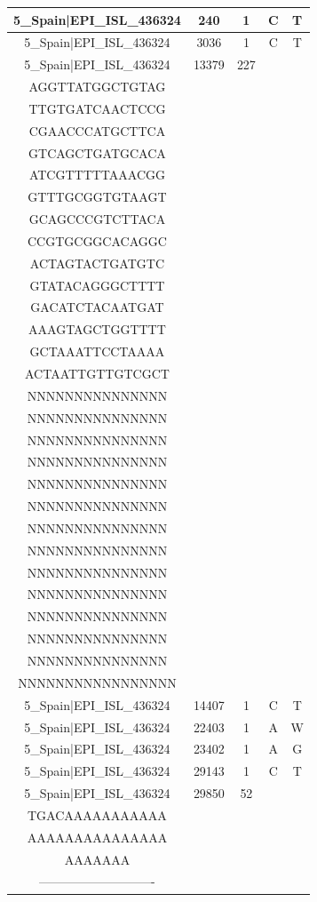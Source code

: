 \documentclass[a4paper,10pt]{article}
\begin{document}
\begin{longtable}{@{}ccccc@{}}
5\_Spain|EPI\_ISL\_436324 & 240 & 1 & C & T \\* \midrule
5\_Spain|EPI\_ISL\_436324 & 3036 & 1 & C & T \\* \midrule
5\_Spain|EPI\_ISL\_436324 & 13379 & 227 & \begin{tabular}[c]{@{}c@{}}TCTGCGGTATGTGGAA\\ AGGTTATGGCTGTAG\\ TTGTGATCAACTCCG\\ CGAACCCATGCTTCA\\ GTCAGCTGATGCACA\\ ATCGTTTTTAAACGG\\ GTTTGCGGTGTAAGT\\ GCAGCCCGTCTTACA\\ CCGTGCGGCACAGGC\\ ACTAGTACTGATGTC\\ GTATACAGGGCTTTT\\ GACATCTACAATGAT\\ AAAGTAGCTGGTTTT\\ GCTAAATTCCTAAAA\\ ACTAATTGTTGTCGCT\end{tabular} & \begin{tabular}[c]{@{}c@{}}NNNNNNNNNNNNNNN\\ NNNNNNNNNNNNNNN\\ NNNNNNNNNNNNNNN\\ NNNNNNNNNNNNNNN\\ NNNNNNNNNNNNNNN\\ NNNNNNNNNNNNNNN\\ NNNNNNNNNNNNNNN\\ NNNNNNNNNNNNNNN\\ NNNNNNNNNNNNNNN\\ NNNNNNNNNNNNNNN\\ NNNNNNNNNNNNNNN\\ NNNNNNNNNNNNNNN\\ NNNNNNNNNNNNNNN\\ NNNNNNNNNNNNNNN\\ NNNNNNNNNNNNNNNNN\end{tabular} \\* \midrule
5\_Spain|EPI\_ISL\_436324 & 14407 & 1 & C & T \\* \midrule
5\_Spain|EPI\_ISL\_436324 & 22403 & 1 & A & W \\* \midrule
5\_Spain|EPI\_ISL\_436324 & 23402 & 1 & A & G \\* \midrule
5\_Spain|EPI\_ISL\_436324 & 29143 & 1 & C & T \\* \midrule
5\_Spain|EPI\_ISL\_436324 & 29850 & 52 & \begin{tabular}[c]{@{}c@{}}AGCTTCTTAGGAGAA\\ TGACAAAAAAAAAAA\\ AAAAAAAAAAAAAAA\\ AAAAAAA\end{tabular} & \begin{tabular}[c]{@{}c@{}}------------------------\\ ----------------------------\end{tabular} \\* \midrule

\end{longtable}
\end{document}
